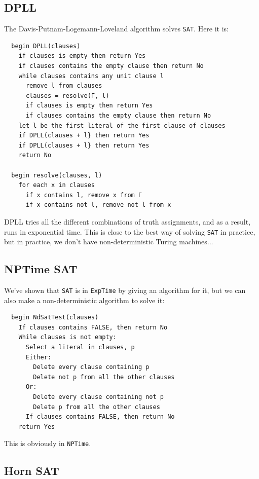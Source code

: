 \subsection{DPLL}

The Davis-Putnam-Logemann-Loveland algorithm solves \texttt{SAT}. Here it is:

\begin{verbatim}
  begin DPLL(clauses)
    if clauses is empty then return Yes
    if clauses contains the empty clause then return No
    while clauses contains any unit clause l
      remove l from clauses
      clauses = resolve(Γ, l)
      if clauses is empty then return Yes
      if clauses contains the empty clause then return No
    let l be the first literal of the first clause of clauses
    if DPLL(clauses + l} then return Yes
    if DPLL(clauses + l} then return Yes
    return No

  begin resolve(clauses, l)
    for each x in clauses
      if x contains l, remove x from Γ
      if x contains not l, remove not l from x
\end{verbatim}

DPLL tries all the different combinations of truth assignments, and as a result,
runs in exponential time. This is close to the best way of solving \texttt{SAT}
in practice, but in practice, we don't have non-deterministic Turing machines...

\subsection{NPTime SAT}

We've shown that \texttt{SAT} is in \texttt{ExpTime} by giving an algorithm for
it, but we can also make a non-deterministic algorithm to solve it:

\begin{verbatim}
  begin NdSatTest(clauses)
    If clauses contains FALSE, then return No
    While clauses is not empty:
      Select a literal in clauses, p
      Either:
        Delete every clause containing p
        Delete not p from all the other clauses
      Or:
        Delete every clause containing not p
        Delete p from all the other clauses
      If clauses contains FALSE, then return No
    return Yes
\end{verbatim}

This is obviously in \texttt{NPTime}.

\subsection{Horn SAT}


